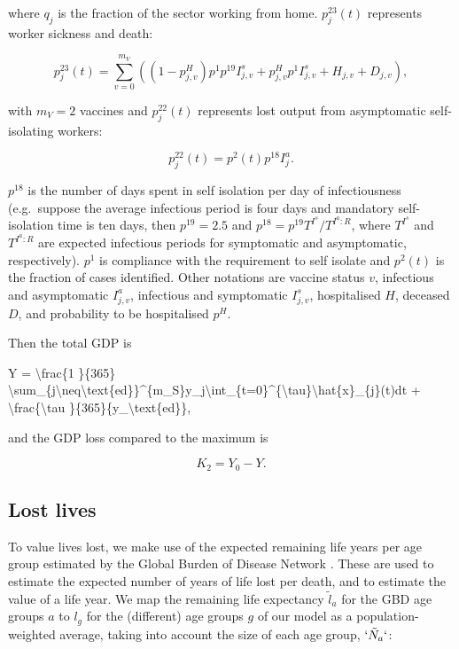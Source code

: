 \documentclass[
]{article}
\newenvironment{Shaded}{\begin{snugshade}}{\end{snugshade}}
\newcommand{\NormalTok}[1]{#1}
\begin{document}
where \(q_j\) is the fraction of the sector working from home. \(p_j^{23}(t)\) represents worker sickness and death:

\[p_j^{23}(t)=\sum_{v=0}^{m_V}\left(\left(1-p^H_{j,v}\right)p^1p^{19}I_{j,v}^{s}+p^H_{j,v}p^1I_{j,v}^{s}+H_{j,v}+D_{j,v}\right),\]

with \(m_V=2\) vaccines and \(p_j^{22}(t)\) represents lost output from asymptomatic self-isolating workers:

\[p_j^{22}(t)=p^2(t)p^{18}I_{j}^{a}.\]

\(p^{18}\) is the number of days spent in self isolation per day of infectiousness (e.g.~suppose the average infectious period is four days and mandatory self-isolation time is ten days, then \(p^{19}=2.5\) and \(p^{18}=p^{19}T^{I^s}/T^{I^a:R}\), where \(T^{I^s}\) and \(T^{I^a:R}\) are expected infectious periods for symptomatic and asymptomatic, respectively). \(p^1\) is compliance with the requirement to self isolate and \(p^2(t)\) is the fraction of cases identified. Other notations are vaccine status \(v\), infectious and asymptomatic \(I_{j,v}^{a}\), infectious and symptomatic \(I_{j,v}^{s}\), hospitalised \(H\), deceased \(D\), and probability to be hospitalised \(p^H\).

Then the total GDP is

\begin{Shaded}
\begin{Highlighting}[]
\NormalTok{Y =  \textbackslash{}frac\{1 \}\{365\} \textbackslash{}sum\_\{j\textbackslash{}neq\textbackslash{}text\{ed\}\}\^{}\{m\_S\}y\_j\textbackslash{}int\_\{t=0\}\^{}\{\textbackslash{}tau\}\textbackslash{}hat\{x\}\_\{j\}(t)dt + \textbackslash{}frac\{\textbackslash{}tau \}\{365\}\{y\_\textbackslash{}text\{ed\}\},}
\end{Highlighting}
\end{Shaded}

and the GDP loss compared to the maximum is

\[K_2=Y_0-Y.\]

\subsection{Lost lives}\label{lost-lives}

To value lives lost, we make use of the expected remaining life years per age group estimated by the Global Burden of Disease Network \citep{GlobalBurdenofDiseaseCollaborativeNetwork2021}. These are used to estimate the expected number of years of life lost per death, and to estimate the value of a life year. We map the remaining life expectancy \(\tilde{l}_a\) for the GBD age groups \(a\) to \(l_g\) for the (different) age groups \(g\) of our model as a population-weighted average, taking into account the size of each age group, \(`\tilde{N}_a`\):
\end{document}
